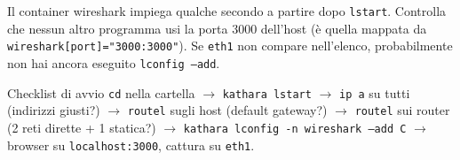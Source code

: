 
\begin{attenzione}
Il container wireshark impiega qualche secondo a partire dopo \texttt{lstart}. Controlla che nessun altro programma usi la porta 3000 dell'host (è quella mappata da \texttt{wireshark[port]="3000:3000"}). Se \texttt{eth1} non compare nell'elenco, probabilmente non hai ancora eseguito \texttt{lconfig --add}.
\end{attenzione}

\begin{appunti}{Checklist di avvio}
\texttt{cd} nella cartella $\to$ \texttt{kathara lstart} $\to$ \texttt{ip a} su tutti (indirizzi giusti?) $\to$ \texttt{routel} sugli host (default gateway?) $\to$ \texttt{routel} sui router (2 reti dirette + 1 statica?) $\to$ \texttt{kathara lconfig -n wireshark --add C} $\to$ browser su \texttt{localhost:3000}, cattura su \texttt{eth1}.
\end{appunti}

